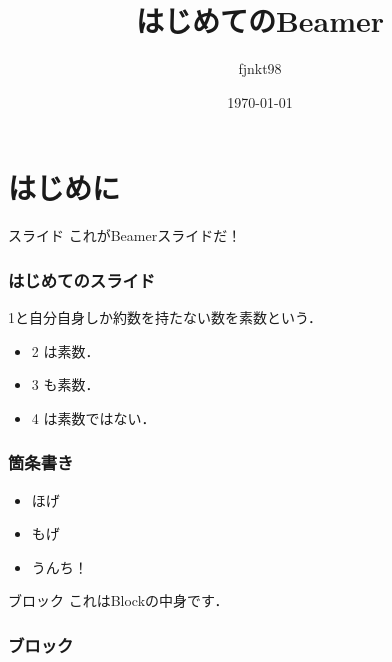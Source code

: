 \documentclass[dvipdfmx, 12pt]{beamer}  %
\title{はじめてのBeamer}
\author{fjnkt98}
\date{\today}
\institute{Centre for Modern Beamer Themes}
\begin{document}
  \maketitle

  \section{はじめに}
  \begin{frame}{}
    \tableofcontents
  \end{frame}

  \begin{frame}{スライド}
    これがBeamerスライドだ！
  \end{frame}

  \begin{frame}
    \frametitle{はじめてのスライド}
    \begin{definition}
      1と自分自身しか約数を持たない数を\alert{素数}という．
    \end{definition}
    \begin{example}
     \begin{itemize}
      \item 2 は素数．
      \item 3 も素数．
      \item 4 は素数ではない．
     \end{itemize}
    \end{example}
  \end{frame}

  \begin{frame}
    \frametitle{箇条書き}
    \begin{itemize}
      \item ほげ
      \item もげ
      \item うんち！
    \end{itemize}
    \begin{block}{ブロック}
      これはBlockの中身です．
    \end{block}
  \end{frame}

  \begin{frame}
    \frametitle{ブロック}

  \end{frame}
\end{document}
